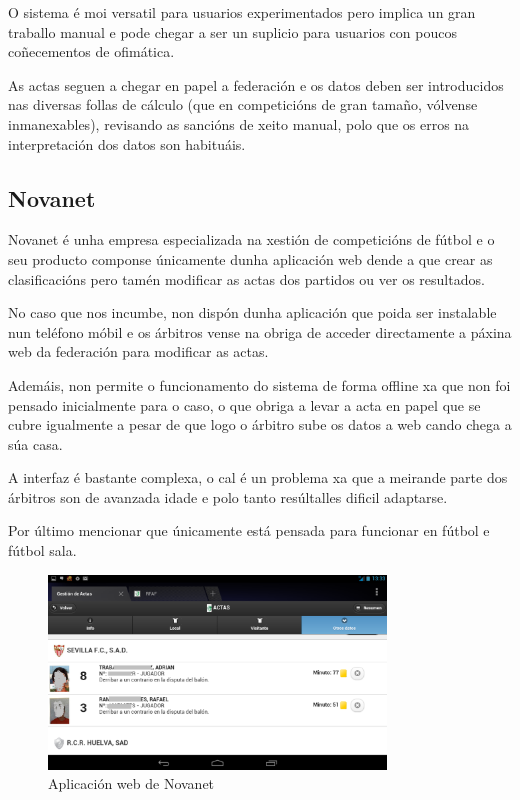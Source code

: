     O sistema é moi versatil para usuarios experimentados pero implica un gran 
traballo manual e pode chegar a ser un suplicio para usuarios con poucos coñecementos de 
ofimática.

  As actas seguen a chegar en papel a federación e os datos deben ser introducidos nas 
diversas follas de cálculo (que en competicións de gran tamaño, vólvense inmanexables), 
revisando as sancións de xeito manual, polo que os erros na interpretación dos datos son 
habituáis.

\clearpage

    \subsection{Novanet}

      Novanet é unha empresa especializada na xestión de competicións de fútbol 
e o seu producto componse únicamente dunha aplicación web dende a que crear as 
clasificacións pero tamén modificar as actas dos partidos ou ver os resultados.

      No caso que nos incumbe, non dispón dunha aplicación que poida ser instalable nun 
teléfono móbil e os árbitros vense na obriga de acceder directamente a páxina web da 
federación para modificar as actas.
  
      Ademáis, non permite o funcionamento do sistema de forma offline xa que non foi 
pensado inicialmente para o caso, o que obriga a levar a acta en papel que se cubre 
igualmente a pesar de que logo o árbitro sube os datos a web cando chega a súa casa.

      A interfaz é bastante complexa, o cal é un problema xa que a meirande parte dos 
árbitros son de avanzada idade e polo tanto resúltalles dificil adaptarse.

      Por último mencionar que únicamente está pensada para funcionar en fútbol e fútbol 
sala.
	
      \begin{figure}[h!]
	\begin{center}
	  \includegraphics[width=0.8\textwidth]{./img/novanet-app.png}
	  \caption{Aplicación web de Novanet}
	\end{center}
      \end{figure}

